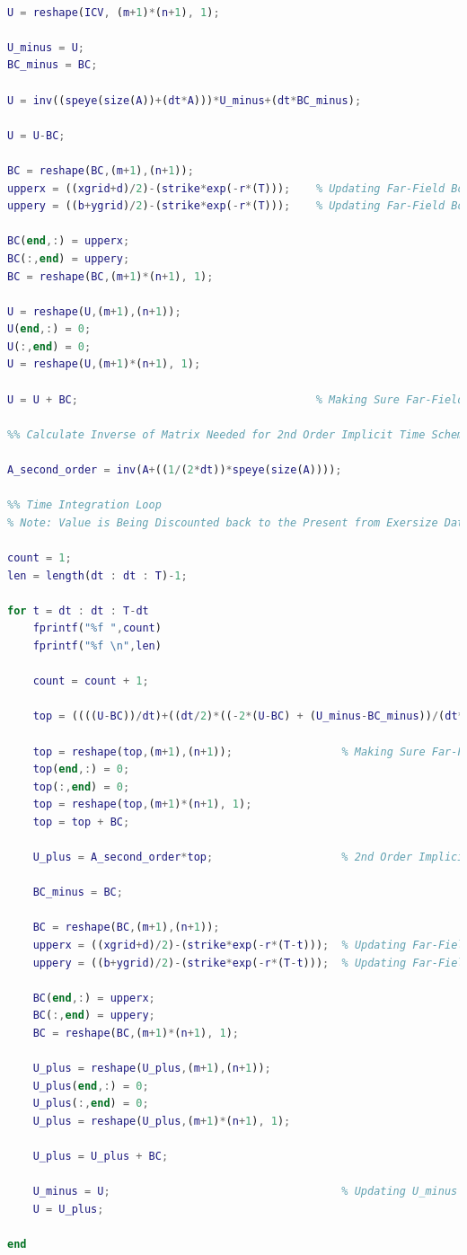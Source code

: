\documentclass[12pt,letterpaper]{article}
\begin{document}
\begin{lstlisting}[language = Matlab]
%% 1st Order Time Scheme to Calculate U After First Time Step

U = reshape(ICV, (m+1)*(n+1), 1);

U_minus = U;
BC_minus = BC;

U = inv((speye(size(A))+(dt*A)))*U_minus+(dt*BC_minus);

U = U-BC;

BC = reshape(BC,(m+1),(n+1));
upperx = ((xgrid+d)/2)-(strike*exp(-r*(T)));    % Updating Far-Field Boundary Conditions for X
uppery = ((b+ygrid)/2)-(strike*exp(-r*(T)));    % Updating Far-Field Boundary Conditions for Y

BC(end,:) = upperx;
BC(:,end) = uppery;
BC = reshape(BC,(m+1)*(n+1), 1);

U = reshape(U,(m+1),(n+1));
U(end,:) = 0;
U(:,end) = 0;
U = reshape(U,(m+1)*(n+1), 1);

U = U + BC;                                     % Making Sure Far-Field Boundaries Have Correct Value in Case of Rounding Error

%% Calculate Inverse of Matrix Needed for 2nd Order Implicit Time Scheme

A_second_order = inv(A+((1/(2*dt))*speye(size(A))));

%% Time Integration Loop
% Note: Value is Being Discounted back to the Present from Exersize Date

count = 1;
len = length(dt : dt : T)-1;

for t = dt : dt : T-dt 
    fprintf("%f ",count)
    fprintf("%f \n",len)

    count = count + 1;

    top = ((((U-BC))/dt)+((dt/2)*((-2*(U-BC) + (U_minus-BC_minus))/(dt*dt))) + BC); % Updating Implicit Scheme Vector

    top = reshape(top,(m+1),(n+1));                 % Making Sure Far-Field Boundaries Have Correct Value in Case of Rounding Error
    top(end,:) = 0;
    top(:,end) = 0;
    top = reshape(top,(m+1)*(n+1), 1);
    top = top + BC;

    U_plus = A_second_order*top;                    % 2nd Order Implicit Scheme for Next Time Step

    BC_minus = BC;

    BC = reshape(BC,(m+1),(n+1));
    upperx = ((xgrid+d)/2)-(strike*exp(-r*(T-t)));  % Updating Far-Field Boundary Conditions for X
    uppery = ((b+ygrid)/2)-(strike*exp(-r*(T-t)));  % Updating Far-Field Boundary Conditions for Y

    BC(end,:) = upperx;
    BC(:,end) = uppery;
    BC = reshape(BC,(m+1)*(n+1), 1);

    U_plus = reshape(U_plus,(m+1),(n+1));
    U_plus(end,:) = 0;
    U_plus(:,end) = 0;
    U_plus = reshape(U_plus,(m+1)*(n+1), 1);
    
    U_plus = U_plus + BC;

    U_minus = U;                                    % Updating U_minus and U for Next Time Step
    U = U_plus;

end
\end{lstlisting}
\end{document}
